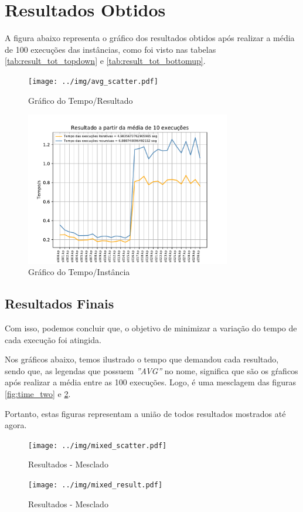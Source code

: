 \documentclass[a4paper, 12pt]{article}
\begin{document}
\newpage

\section{Resultados Obtidos}
A figura abaixo representa o gráfico dos resultados obtidos após realizar a média de 100 execuções das instâncias,
como foi visto nas tabelas \ref{tab:result_tot_topdown} e \ref{tab:result_tot_bottomup}.

\begin{figure}[!htb]
    \centering
    \texttt{[image: ../img/avg\_scatter.pdf]}
    \caption{Gráfico do Tempo/Resultado}
    \label{fig:avg_scatter}
\end{figure}
\begin{figure}[!htb]
    \centering
    \includegraphics[width=0.8\textwidth]{../img/avg_result.pdf}
    \caption{Gráfico do Tempo/Instância}
    \label{fig:avg_result}
\end{figure}
\clearpage

\subsection{Resultados Finais}
Com isso, podemos concluir que, o objetivo de minimizar a variação do tempo de cada execução foi atingida.

Nos gráficos abaixo, temos ilustrado o tempo que demandou cada resultado, sendo que, as legendas que possuem
{\it ''AVG''} no nome, significa que são os gŕaficos após realizar a média entre as 100 execuções.
Logo, é uma mesclagem das figuras \ref{fig:time_two} e \ref{fig:avg_result}.

Portanto, estas figuras representam a união de todos resultados mostrados até agora.

\begin{figure}[!htb]
    \centering
    \begin{minipage}{0.55\textwidth}
        \centering
        \texttt{[image: ../img/mixed\_scatter.pdf]}
        \caption{Resultados - Mesclado}
        \label{fig:mixed_result}   
    \end{minipage}%
    \begin{minipage}{0.6\textwidth}
        \centering
        \texttt{[image: ../img/mixed\_result.pdf]}
        \caption{Resultados - Mesclado}
        \label{fig:mixed_scatter}
    \end{minipage}
\end{figure}
\end{document}
